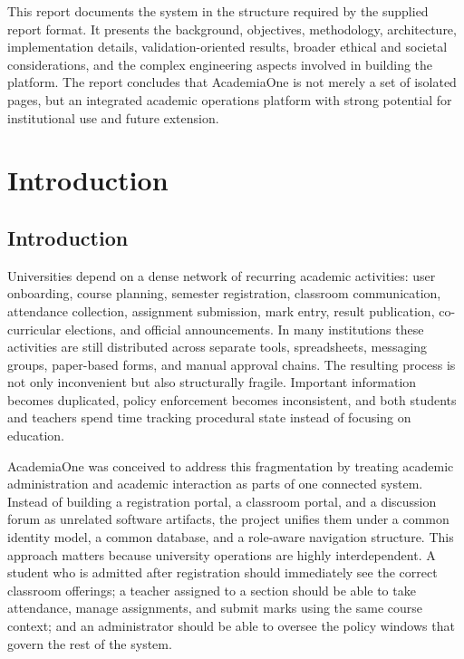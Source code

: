 \documentclass[12pt,a4paper]{report}
\newcommand{\systemName}{AcademiaOne}
\begin{document}
This report documents the system in the structure required by the supplied report format. It presents the background, objectives, methodology, architecture, implementation details, validation-oriented results, broader ethical and societal considerations, and the complex engineering aspects involved in building the platform. The report concludes that \systemName{} is not merely a set of isolated pages, but an integrated academic operations platform with strong potential for institutional use and future extension.

\tableofcontents
\clearpage
{}
\listoftables
\clearpage
{}
\listoffigures

\clearpage
{}
\setcounter{page}{1}

\chapter{Introduction}

\section{Introduction}
Universities depend on a dense network of recurring academic activities: user onboarding, course planning, semester registration, classroom communication, attendance collection, assignment submission, mark entry, result publication, co-curricular elections, and official announcements. In many institutions these activities are still distributed across separate tools, spreadsheets, messaging groups, paper-based forms, and manual approval chains. The resulting process is not only inconvenient but also structurally fragile. Important information becomes duplicated, policy enforcement becomes inconsistent, and both students and teachers spend time tracking procedural state instead of focusing on education.

\systemName{} was conceived to address this fragmentation by treating academic administration and academic interaction as parts of one connected system. Instead of building a registration portal, a classroom portal, and a discussion forum as unrelated software artifacts, the project unifies them under a common identity model, a common database, and a role-aware navigation structure. This approach matters because university operations are highly interdependent. A student who is admitted after registration should immediately see the correct classroom offerings; a teacher assigned to a section should be able to take attendance, manage assignments, and submit marks using the same course context; and an administrator should be able to oversee the policy windows that govern the rest of the system.
\end{document}
